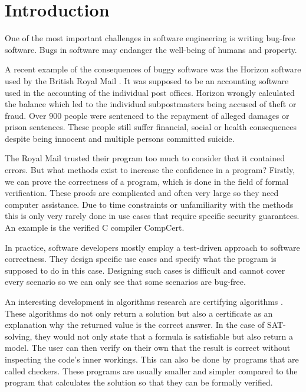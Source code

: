 \chapter{Introduction}

One of the most important challenges in software engineering is writing bug-free software.  Bugs in software may endanger the well-being of humans and property.

A recent example of the consequences of buggy software was the Horizon software used by the British Royal Mail \cite{horizonRoyalMail}. It was supposed to be an accounting software used in the accounting of the individual post offices. Horizon wrongly calculated the balance which led to the individual subpostmasters being accused of theft or fraud. Over 900 people were sentenced to the repayment of alleged damages or prison sentences. These people still suffer financial, social or health consequences despite being innocent and multiple persons committed suicide.

The Royal Mail trusted their program too much to consider that it contained errors. But what methods exist to increase the confidence in a program?
Firstly, we can prove the correctness of a program, which is done in the field of formal verification. These proofs are complicated and often very large so they need computer assistance. Due to time constraints or unfamiliarity with the methods this is only very rarely done in use cases that require specific security guarantees. An example is the verified C compiler CompCert\cite{CCertComp}.

In practice, software developers mostly employ a test-driven approach to software correctness. They design specific use cases and specify what the program is supposed to do in this case. Designing such cases is difficult and cannot cover every scenario so we can only see that some scenarios are bug-free.

An interesting development in algorithms research are certifying algorithms \cite{CertAlg}. These algorithms do not only return a solution but also a certificate as an explanation why the returned value is the correct answer. In the case of SAT-solving, they would not only state that a formula is satisfiable but also return a model. The user can then verify on their own that the result is correct without inspecting the code's inner workings. This can also be done by programs that are called checkers. These programs are usually smaller and simpler compared to the program that calculates the solution so that they can be formally verified. 

